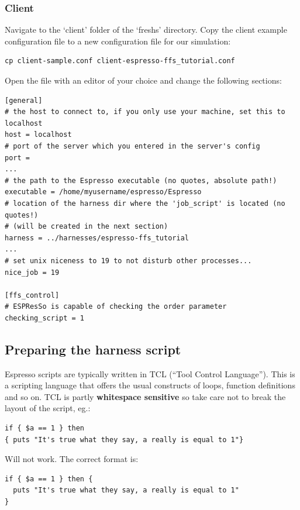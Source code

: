 \documentclass[a4paper,oneside]{article}
\newenvironment{mylisting}
{\begin{list}{}{\setlength{\leftmargin}{1em}}\item\scriptsize\bfseries}
{\end{list}}
\begin{document}
\subsubsection{Client}
Navigate to the `client' folder of the `freshs' directory. Copy the client example configuration file to a new configuration file for our simulation:
\begin{mylisting}
\begin{verbatim}
cp client-sample.conf client-espresso-ffs_tutorial.conf
\end{verbatim}
\end{mylisting}
Open the file with an editor of your choice and change the following sections:
\begin{mylisting}
\begin{verbatim}
[general]
# the host to connect to, if you only use your machine, set this to localhost
host = localhost
# port of the server which you entered in the server's config
port = 
...
# the path to the Espresso executable (no quotes, absolute path!)
executable = /home/myusername/espresso/Espresso
# location of the harness dir where the 'job_script' is located (no quotes!)
# (will be created in the next section)
harness = ../harnesses/espresso-ffs_tutorial
...
# set unix niceness to 19 to not disturb other processes...
nice_job = 19

[ffs_control]
# ESPResSo is capable of checking the order parameter
checking_script = 1
\end{verbatim}
\end{mylisting}


\subsection{Preparing the harness script}

Espresso scripts are typically written in TCL (``Tool Control Language'').  This is a scripting language that offers the usual constructs of loops, function definitions and so on.  TCL is partly {\bf whitespace sensitive} so take care not to break the layout of the script, eg.: 
\begin{mylisting}
\begin{verbatim}
if { $a == 1 } then 
{ puts "It's true what they say, a really is equal to 1"}
\end{verbatim}
\end{mylisting}

Will not work. The correct format is:
\begin{mylisting}
\begin{verbatim}
if { $a == 1 } then { 
  puts "It's true what they say, a really is equal to 1"
}
\end{verbatim}
\end{mylisting}
\end{document}
